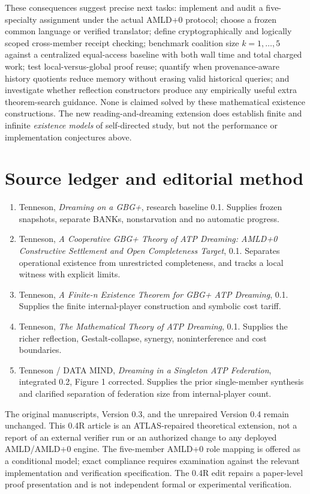 \documentclass[11pt]{article}
\begin{document}
These consequences suggest precise next tasks: implement and audit a five-specialty assignment under the actual AMLD+0 protocol; choose a frozen common language or verified translator; define cryptographically and logically scoped cross-member receipt checking; benchmark coalition size $k=1,\ldots,5$ against a centralized equal-access baseline with both wall time and total charged work; test local-versus-global proof reuse; quantify when provenance-aware history quotients reduce memory without erasing valid historical queries; and investigate whether reflection constructors produce any empirically useful extra theorem-search guidance. None is claimed solved by these mathematical existence constructions. The new reading-and-dreaming extension does establish finite and infinite \emph{existence models} of self-directed study, but not the performance or implementation conjectures above.

\section*{Source ledger and editorial method}
\begin{enumerate}[leftmargin=*,nosep]
\item [S1] Tenneson, \emph{Dreaming on a GBG+}, research baseline 0.1. Supplies frozen snapshots, separate BANKs, nonstarvation and no automatic progress.
\item [S2] Tenneson, \emph{A Cooperative GBG+ Theory of ATP Dreaming: AMLD+0 Constructive Settlement and Open Completeness Target}, 0.1. Separates operational existence from unrestricted completeness, and tracks a local witness with explicit limits.
\item [S3] Tenneson, \emph{A Finite-n Existence Theorem for GBG+ ATP Dreaming}, 0.1. Supplies the finite internal-player construction and symbolic cost tariff.
\item [S4] Tenneson, \emph{The Mathematical Theory of ATP Dreaming}, 0.1. Supplies the richer reflection, Gestalt-collapse, synergy, noninterference and cost boundaries.
\item [S5] Tenneson / DATA MIND, \emph{Dreaming in a Singleton ATP Federation}, integrated 0.2, Figure 1 corrected. Supplies the prior single-member synthesis and clarified separation of federation size from internal-player count.
\end{enumerate}
The original manuscripts, Version 0.3, and the unrepaired Version 0.4 remain unchanged. This 0.4R article is an ATLAS-repaired theoretical extension, not a report of an external verifier run or an authorized change to any deployed AMLD/AMLD+0 engine. The five-member AMLD+0 role mapping is offered as a conditional model; exact compliance requires examination against the relevant implementation and verification specification. The 0.4R edit repairs a paper-level proof presentation and is not independent formal or experimental verification.
\end{document}
